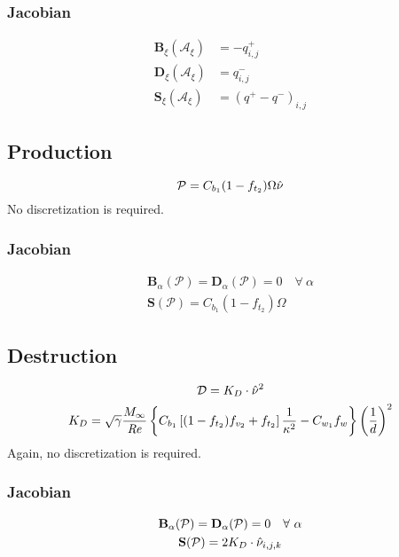 \documentclass{SelimArticle}
\begin{document}
\subsubsection{Jacobian}
\begin{align}
    \mathbf{B}_\xi(\mathcal{A}_\xi) &= -q^+_{i,j}\\
    \mathbf{D}_\xi(\mathcal{A}_\xi) &= q^-_{i,j}\\
    \mathbf{S}_\xi(\mathcal{A}_\xi) &= \left(q^+ - q^-\right)_{i,j}
\end{align}


\subsection{Production}
$$
\mathcal{P} = C_{b_1}(1 - f_{t_2})\Omega\hat{\nu}
$$
No discretization is required.
\subsubsection{Jacobian}
\begin{gather}
    \mathbf{B}_\alpha(\mathcal{P}) = \mathbf{D}_\alpha(\mathcal{P}) = 0 \quad \forall ~ \alpha\\
    \mathbf{S}(\mathcal{P}) = C_{b_1}(1 - f_{t_2})\Omega
\end{gather}


\subsection{Destruction}
\begin{gather}
    \mathcal{D} = K_D\cdot \hat{\nu}^2\\
    K_D =  \sqrt{\gamma}\frac{M_\infty}{\mathit{Re}} \left\{
        C_{b_1}\left[(1 - f_{t_2})f_{v_2} + f_{t_2}\right]\frac{1}{\kappa^2} - C_{w_1}f_w
    \right\} \left( \frac{1}{d}\right)^2
\end{gather}
Again, no discretization is required.

\subsubsection{Jacobian}
\begin{gather}
    \mathbf{B}_\alpha(\mathcal{P}) = \mathbf{D}_\alpha(\mathcal{P}) = 0 \quad \forall ~ \alpha\\
    \mathbf{S}(\mathcal{P}) = 2K_D \cdot \hat{\nu}_{i,j,k}
\end{gather}
\end{document}
